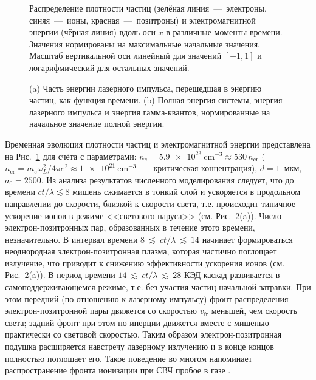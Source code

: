 \begin{figure}[h!]
	\caption[Распределение плотности частиц и электромагнитной энергии в различные моменты времени в численном моделировании]{\label{Sim_res} Распределение плотности частиц (зелёная линия~---~электроны, синяя~---~ионы, красная~---~позитроны) и электромагнитной энергии (чёрная линия) вдоль оси $x$ в различные моменты времени. Значения нормированы на максимальные начальные значения. Масштаб вертикальной оси линейный для значений $[-1,1]$ и логарифмический для остальных значений.}
\end{figure}

\begin{figure}[h!]
	\caption[Баланс энергии в системе в численном моделировании с параметрами $n_{e}=\SI{5.9e23}{\centi\meter^{-3}}$, $d=1$~мкм, $a_{0}=2500$]{\label{Sim_en} (a) Часть энергии лазерного импульса, перешедшая в энергию частиц, как функция времени. (b) Полная энергия системы, энергия лазерного импульса и энергия гамма-квантов, нормированные на начальное значение полной энергии.}
\end{figure}

Временная эволюция плотности частиц и электромагнитной энергии представлена на Рис.~\ref{Sim_res} для счёта с параметрами: ${n_{e}=\SI{5.9e23}{\centi\meter^{-3}}\approx530\, n_\mathrm{cr}}$ (${n_\mathrm{cr}=m_{e}\omega_{L}^{2}/4\pi e^{2}\approx\SI{1e21}{\centi\meter^{-3}}}$~---~критическая концентрация), $d=1$~мкм, $a_{0}=2500$. 
Из анализа результатов численного моделирования следует, что до времени $ct/\lambda\lesssim 8$ мишень сжимается в тонкий слой и ускоряется в продольном направлении до скорости, близкой к скорости света, т.е. происходит типичное ускорение ионов в режиме <<светового паруса>> (см. Рис.~\ref{Sim_en}\;(a)). 
Число электрон-позитронных пар, образованных в течение этого времени, незначительно. В интервал времени $8~\lesssim~ct/\lambda~\lesssim~14$ начинает формироваться неоднородная электрон-позитронная плазма, которая частично поглощает излучение, что приводит к снижению эффективности ускорения ионов (см. Рис.~\ref{Sim_en}\;(a)).
В период времени $14~\lesssim~ct/\lambda~\lesssim~28$ КЭД каскад развивается в самоподдерживающемся режиме, т.е. без участия частиц начальной затравки. 
При этом передний (по отношению к лазерному импульсу) фронт распределения электрон-позитронной пары движется со скоростью $v_\mathrm{fr}$ меньшей, чем скорость света; задний фронт при этом по инерции движется вместе с мишенью практически со световой скоростью. 
Таким образом электрон-позитронная подушка расширяется навстречу лазерному излучению и в конце концов полностью поглощает его. 
Такое поведение во многом напоминает распространение фронта ионизации при СВЧ пробое в газе \cite{semenov1982breakdown}.

